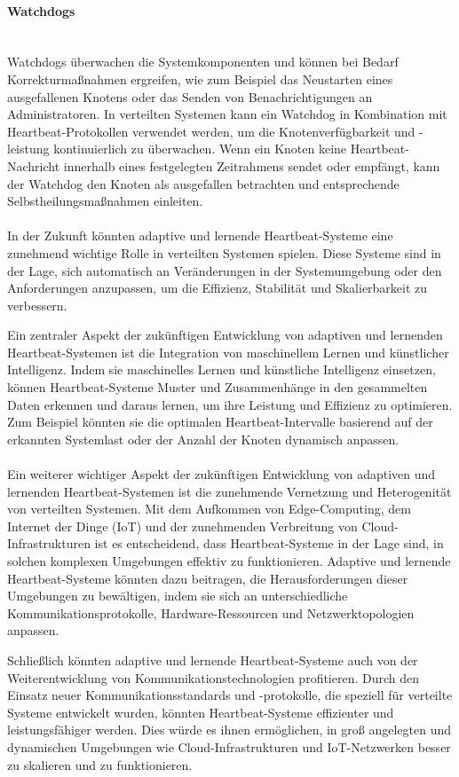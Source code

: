 \documentclass[../vs-script-first-v01.tex]{subfiles}
\begin{document}
\paragraph{Watchdogs}\mbox{}\\
Watchdogs überwachen die Systemkomponenten und können bei Bedarf Korrekturmaßnahmen ergreifen, wie zum Beispiel das Neustarten eines ausgefallenen Knotens oder das Senden von Benachrichtigungen an Administratoren. In verteilten Systemen kann ein Watchdog in Kombination mit Heartbeat-Protokollen verwendet werden, um die Knotenverfügbarkeit und -leistung kontinuierlich zu überwachen. Wenn ein Knoten keine Heartbeat-Nachricht innerhalb eines festgelegten Zeitrahmens sendet oder empfängt, kann der Watchdog den Knoten als ausgefallen betrachten und entsprechende Selbstheilungsmaßnahmen einleiten.
\\\\
In der Zukunft könnten adaptive und lernende Heartbeat-Systeme eine zunehmend wichtige Rolle in verteilten Systemen spielen. Diese Systeme sind in der Lage, sich automatisch an Veränderungen in der Systemumgebung oder den Anforderungen anzupassen, um die Effizienz, Stabilität und Skalierbarkeit zu verbessern.

Ein zentraler Aspekt der zukünftigen Entwicklung von adaptiven und lernenden Heartbeat-Systemen ist die Integration von maschinellem Lernen und künstlicher Intelligenz. Indem sie maschinelles Lernen und künstliche Intelligenz einsetzen, können Heartbeat-Systeme Muster und Zusammenhänge in den gesammelten Daten erkennen und daraus lernen, um ihre Leistung und Effizienz zu optimieren. Zum Beispiel könnten sie die optimalen Heartbeat-Intervalle basierend auf der erkannten Systemlast oder der Anzahl der Knoten dynamisch anpassen.
\\\\
Ein weiterer wichtiger Aspekt der zukünftigen Entwicklung von adaptiven und lernenden Heartbeat-Systemen ist die zunehmende Vernetzung und Heterogenität von verteilten Systemen. Mit dem Aufkommen von Edge-Computing, dem Internet der Dinge (IoT) und der zunehmenden Verbreitung von Cloud-Infrastrukturen ist es entscheidend, dass Heartbeat-Systeme in der Lage sind, in solchen komplexen Umgebungen effektiv zu funktionieren. Adaptive und lernende Heartbeat-Systeme könnten dazu beitragen, die Herausforderungen dieser Umgebungen zu bewältigen, indem sie sich an unterschiedliche Kommunikationsprotokolle, Hardware-Ressourcen und Netzwerktopologien anpassen.

Schließlich könnten adaptive und lernende Heartbeat-Systeme auch von der Weiterentwicklung von Kommunikationstechnologien profitieren. Durch den Einsatz neuer Kommunikationsstandards und -protokolle, die speziell für verteilte Systeme entwickelt wurden, könnten Heartbeat-Systeme effizienter und leistungsfähiger werden. Dies würde es ihnen ermöglichen, in groß angelegten und dynamischen Umgebungen wie Cloud-Infrastrukturen und IoT-Netzwerken besser zu skalieren und zu funktionieren.
\end{document}
